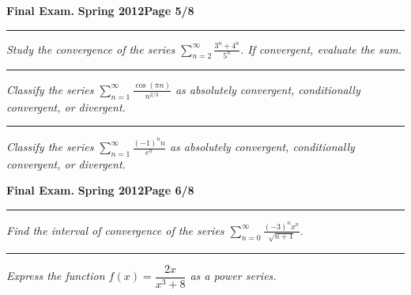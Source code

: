 \documentclass[12pt]{article}
\begin{document}
\hfill{\large\bf Final Exam.}\hfill{\large\bf
  Spring 2012}\hfill{\large\bf Page 5/8}\hrule
  
\bigskip

{\problem[8 pts] \em Study the convergence of the series
  $\displaystyle{\sum_{n=2}^\infty \frac{3^n+4^n}{5^n}}$.  If
  convergent, evaluate the sum.
\vspace{2cm}
\begin{flushright}
\end{flushright}
\hrule
{\problem[5 pts] \em Classify the series $\displaystyle{\sum_{n=1}^\infty
    \frac{\cos (\pi n)}{n^{2/3}}}$ as absolutely convergent,
  conditionally convergent, or divergent.} 
\vspace{3.5cm}
\begin{flushright}
\end{flushright}
\hrule
{\problem[7 pts] \em Classify the series $\displaystyle{\sum_{n=1}^\infty
    \frac{(-1)^n n}{e^n}}$ as absolutely
  convergent, conditionally convergent, or divergent.}
\vspace{4cm}
\begin{flushright}
\end{flushright}
\newpage

\hfill{\large\bf Final Exam.}\hfill{\large\bf
  Spring 2012}\hfill{\large\bf Page 6/8}\hrule

\bigskip
{\problem[8 pts] \em Find the interval of convergence of the series
  $\displaystyle{\sum_{n=0}^\infty \frac{(-3)^n x^n}{\sqrt{n+1}}}$.}
\vspace{7.5cm}
\begin{flushright}
\end{flushright}
\hrule
{\problem[7 pts] \em Express the function $f(x) = \dfrac{2x}{x^3+8}$ as a
  power series.}
\vspace{9cm}
\begin{flushright}
\end{flushright}
\newpage

}
\end{document}
